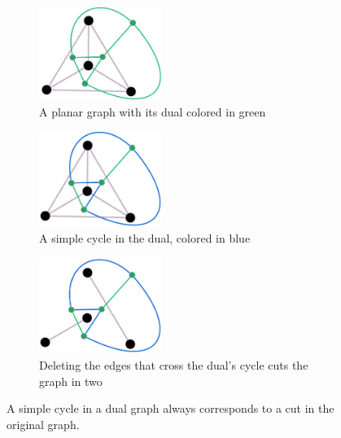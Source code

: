 \begin{figure}
    \centering
    \begin{subfigure}{.3\textwidth}
        \centering
        \includegraphics[width=4cm]{figures/duality/k4 with dual.png}
        \caption{A planar graph with its dual colored in green}
        \label{k4-with-dual}
    \end{subfigure}\hfill%
    \begin{subfigure}{.3\textwidth}
        \centering
        \includegraphics[width=4cm]{figures/duality/dual with cycle.png}
        \caption{A simple cycle in the dual, colored in blue}
        \label{dual-with-cycle}
    \end{subfigure}\hfill%
    \begin{subfigure}{.3\textwidth}
        \centering
        \includegraphics[width=4cm]{figures/duality/k4 cut in pieces.png}
        \caption{Deleting the edges that cross the dual's cycle cuts the graph in two}
        \label{k4-cut}
    \end{subfigure}
    \caption{A simple cycle in a dual graph always corresponds to a cut in the original graph.}
    \label{cycle-cut}
\end{figure}
